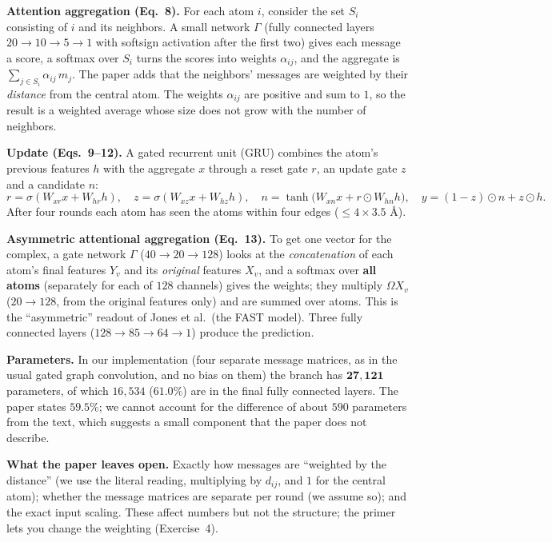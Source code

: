 \documentclass[11pt]{article}
\begin{document}
\textbf{Attention aggregation (Eq.~8).} For each atom $i$, consider the set $S_i$ consisting of $i$ and its neighbors. A small network $\Gamma$ (fully connected layers $20\to10\to5\to1$ with softsign activation after the first two) gives each message a score, a softmax over $S_i$ turns the scores into weights $\alpha_{ij}$, and the aggregate is $\sum_{j\in S_i}\alpha_{ij}\,m_j$. The paper adds that the neighbors' messages are weighted by their \emph{distance} from the central atom. The weights $\alpha_{ij}$ are positive and sum to $1$, so the result is a weighted average whose size does not grow with the number of neighbors.

\textbf{Update (Eqs.~9--12).} A gated recurrent unit (GRU) combines the atom's previous features $h$ with the aggregate $x$ through a reset gate $r$, an update gate $z$ and a candidate $n$:
\[
  r=\sigma(W_{xr}x+W_{hr}h),\quad z=\sigma(W_{xz}x+W_{hz}h),\quad n=\tanh\big(W_{xn}x+r\odot W_{hn}h\big),\quad y=(1-z)\odot n+z\odot h .
\]
After four rounds each atom has seen the atoms within four edges ($\le4\times3.5$ \AA).

\textbf{Asymmetric attentional aggregation (Eq.~13).} To get one vector for the complex, a gate network $\Gamma$ ($40\to20\to128$) looks at the \emph{concatenation} of each atom's final features $Y_v$ and its \emph{original} features $X_v$, and a softmax over \textbf{all atoms} (separately for each of $128$ channels) gives the weights; they multiply $\Omega X_v$ ($20\to128$, from the original features only) and are summed over atoms. This is the ``asymmetric'' readout of Jones et al.\ (the FAST model). Three fully connected layers ($128\to85\to64\to1$) produce the prediction.

\textbf{Parameters.} In our implementation (four separate message matrices, as in the usual gated graph convolution, and no bias on them) the branch has $\mathbf{27{,}121}$ parameters, of which $16{,}534$ ($61.0\%$) are in the final fully connected layers. The paper states $59.5\%$; we cannot account for the difference of about $590$ parameters from the text, which suggests a small component that the paper does not describe.

\textbf{What the paper leaves open.} Exactly how messages are ``weighted by the distance'' (we use the literal reading, multiplying by $d_{ij}$, and $1$ for the central atom); whether the message matrices are separate per round (we assume so); and the exact input scaling. These affect numbers but not the structure; the primer lets you change the weighting (Exercise~4).
\end{document}
